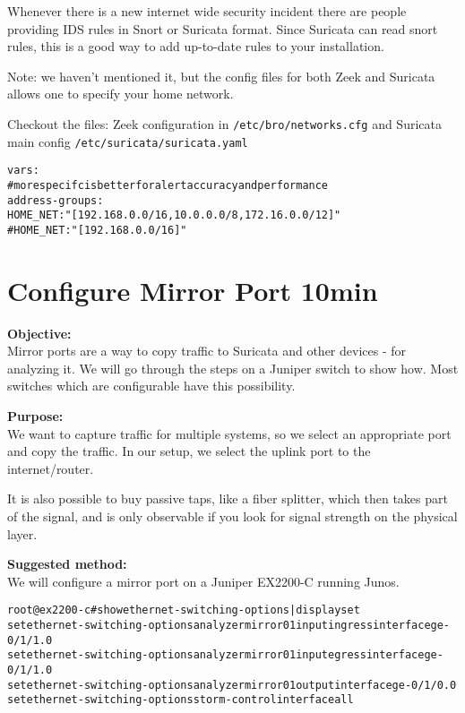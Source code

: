 \documentclass[a4paper,11pt,notitlepage]{report}
\begin{document}
Whenever there is a new internet wide security incident there are people providing IDS rules in Snort or Suricata format. Since Suricata can read snort rules, this is a good way to add up-to-date rules to your installation.

Note: we haven't mentioned it, but the config files for both Zeek and Suricata allows one to specify your home network.

Checkout the files: Zeek configuration in \verb+/etc/bro/networks.cfg+ and Suricata main config \verb+/etc/suricata/suricata.yaml+


\begin{alltt}\small
vars:
  # more specifc is better for alert accuracy and performance
  address-groups:
    HOME_NET: "[192.168.0.0/16,10.0.0.0/8,172.16.0.0/12]"
    #HOME_NET: "[192.168.0.0/16]"
\end{alltt}

\chapter{Configure Mirror Port 10min}
\label{ex:mirrorport}


{\bf Objective:} \\
Mirror ports are a way to copy traffic to Suricata and other devices - for analyzing it. We will go through the steps on a Juniper switch to show how.
Most switches which are configurable have this possibility.


{\bf Purpose:}\\
We want to capture traffic for multiple systems, so we select an appropriate port and copy the traffic. In our setup, we select the uplink port to the internet/router.

It is also possible to buy passive taps, like a fiber splitter, which then takes part of the signal, and is only observable if you look for signal strength on the physical layer.


{\bf Suggested method:}\\
We will configure a mirror port on a Juniper EX2200-C running Junos.

\begin{alltt}
root@ex2200-c# show ethernet-switching-options | display set
set ethernet-switching-options analyzer mirror01 input ingress interface ge-0/1/1.0
set ethernet-switching-options analyzer mirror01 input egress interface ge-0/1/1.0
set ethernet-switching-options analyzer mirror01 output interface ge-0/1/0.0
set ethernet-switching-options storm-control interface all
\end{alltt}
\end{document}
